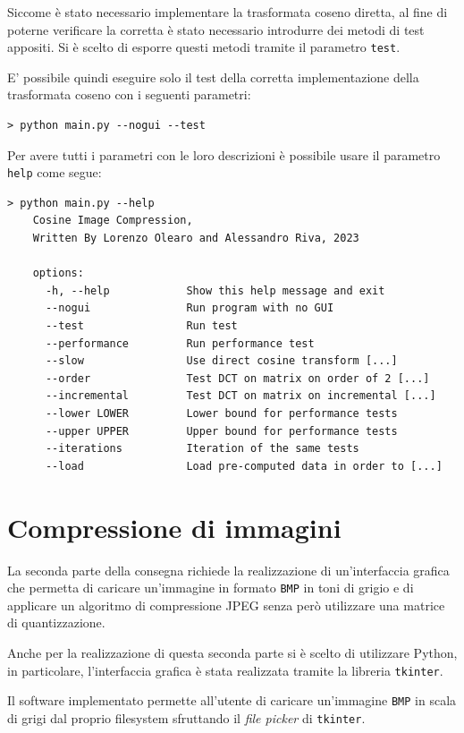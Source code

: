 \documentclass[a4paper, 12pt]{article}
\begin{document}
Siccome è stato necessario implementare la trasformata coseno diretta, al fine
di poterne verificare la corretta è stato necessario introdurre dei metodi di
test appositi. Si è scelto di esporre questi metodi tramite il parametro
\texttt{test}.

E' possibile quindi eseguire solo il test della corretta implementazione della
trasformata coseno con i seguenti parametri:
\vspace{12pt}
\begin{lstlisting}[frame=single]
 > python main.py --nogui --test
\end{lstlisting}

Per avere tutti i parametri con le loro descrizioni è possibile usare il
parametro \texttt{help} come segue:
\vspace{12pt}
\begin{lstlisting}[frame=single]
 > python main.py --help
    Cosine Image Compression,
    Written By Lorenzo Olearo and Alessandro Riva, 2023

    options:
      -h, --help            Show this help message and exit
      --nogui               Run program with no GUI
      --test                Run test
      --performance         Run performance test
      --slow                Use direct cosine transform [...]
      --order               Test DCT on matrix on order of 2 [...]
      --incremental         Test DCT on matrix on incremental [...]
      --lower LOWER         Lower bound for performance tests
      --upper UPPER         Upper bound for performance tests
      --iterations          Iteration of the same tests
      --load                Load pre-computed data in order to [...]
\end{lstlisting}




\section{Compressione di immagini}
La seconda parte della consegna richiede la realizzazione di un'interfaccia
grafica che permetta di caricare un'immagine in formato \texttt{BMP} in toni di
grigio e di applicare un algoritmo di compressione JPEG senza però utilizzare una
matrice di quantizzazione.

Anche per la realizzazione di questa seconda parte si è scelto di utilizzare
Python, in particolare, l'interfaccia grafica è stata realizzata tramite la
libreria \texttt{tkinter}.

Il software implementato permette all'utente di caricare un'immagine
\texttt{BMP} in scala di grigi dal proprio filesystem sfruttando il \textit{file
  picker} di \texttt{tkinter}.
\end{document}
